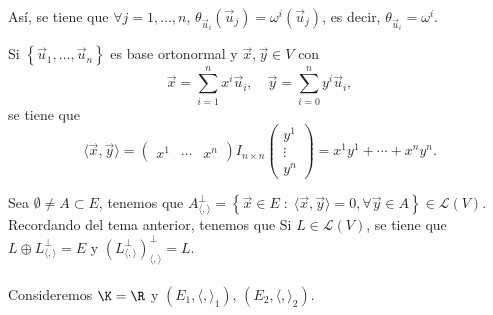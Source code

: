Así, se tiene que $\displaystyle \forall j = 1, \ldots, n $, $\displaystyle \theta_{\vec{u}_{i}} \left(\vec{u}_{j}\right) = \omega^{i}\left(\vec{u}_{j}\right) $, es decir, $\displaystyle \theta_{\vec{u}_{i}} = \omega^{i} $.
\begin{observation}
\normalfont Si $\displaystyle \left\{ \vec{u}_{1}, \ldots, \vec{u}_{n}\right\}  $ es base ortonormal y $\displaystyle \vec{x}, \vec{y} \in V $ con 
\[ \vec{ x} = \sum^{n}_{i = 1}x^{i}\vec{u}_{i}, \quad \vec{y} = \sum^{n}_{ i= 0}y^{i}\vec{u}_{i} ,\]
se tiene que 
\[\langle \vec{x}, \vec{y} \rangle = \begin{pmatrix} x^{1} & \cdots & x^{n} \end{pmatrix} I_{n\times n}\begin{pmatrix} y^{1} \\ \vdots \\ y^{n} \end{pmatrix} = x^{1}y^{1} + \cdots + x^{n}y^{n}.\]
\end{observation}
Sea $\displaystyle \emptyset \neq A \subset E $, tenemos que $\displaystyle A^{\perp }_{\langle, \rangle } = \left\{ \vec{x} \in E \; : \; \langle \vec{x}, \vec{y} \rangle = 0, \forall\vec{y} \in A\right\} \in \mathcal{L}\left(V\right) $. Recordando del tema anterior, tenemos que Si $\displaystyle L \in \mathcal{L}\left(V\right) $, se tiene que $\displaystyle L \oplus L^{\perp }_{\langle, \rangle} = E $ y $\displaystyle \left(L^{\perp }_{\langle, \rangle }\right)^{\perp }_{\langle, \rangle} = L $. \\ \\
Consideremos $\displaystyle \K = \R $ y $\displaystyle \left(E_{1}, \langle, \rangle_{1}\right) $, $\displaystyle \left(E_{2}, \langle, \rangle_{2}\right) $.
